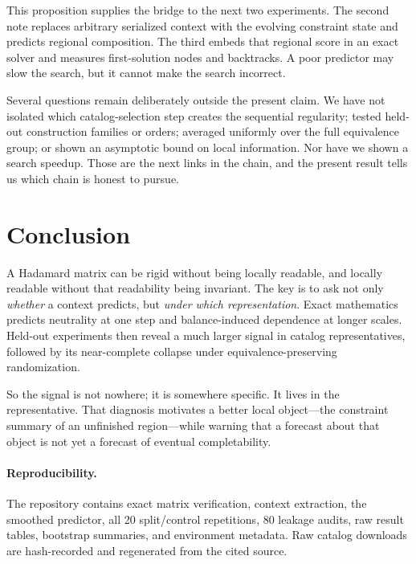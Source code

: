 \documentclass[10pt,twoside]{article}
\theoremstyle{noteplain}
\theoremstyle{definition}
\begin{document}
This proposition supplies the bridge to the next two experiments.  The second note replaces arbitrary serialized context with the evolving constraint state and predicts regional composition.  The third embeds that regional score in an exact solver and measures first-solution nodes and backtracks.  A poor predictor may slow the search, but it cannot make the search incorrect.

Several questions remain deliberately outside the present claim.  We have not isolated which catalog-selection step creates the sequential regularity; tested held-out construction families or orders; averaged uniformly over the full equivalence group; or shown an asymptotic bound on local information.  Nor have we shown a search speedup.  Those are the next links in the chain, and the present result tells us which chain is honest to pursue.

\section{Conclusion}

A Hadamard matrix can be rigid without being locally readable, and locally readable without that readability being invariant.  The key is to ask not only \emph{whether} a context predicts, but \emph{under which representation}.  Exact mathematics predicts neutrality at one step and balance-induced dependence at longer scales.  Held-out experiments then reveal a much larger signal in catalog representatives, followed by its near-complete collapse under equivalence-preserving randomization.

So the signal is not nowhere; it is somewhere specific.  It lives in the representative.  That diagnosis motivates a better local object---the constraint summary of an unfinished region---while warning that a forecast about that object is not yet a forecast of eventual completability.

\paragraph{Reproducibility.}
The repository contains exact matrix verification, context extraction, the smoothed predictor, all 20 split/control repetitions, 80 leakage audits, raw result tables, bootstrap summaries, and environment metadata.  Raw catalog downloads are hash-recorded and regenerated from the cited source.



\end{document}
